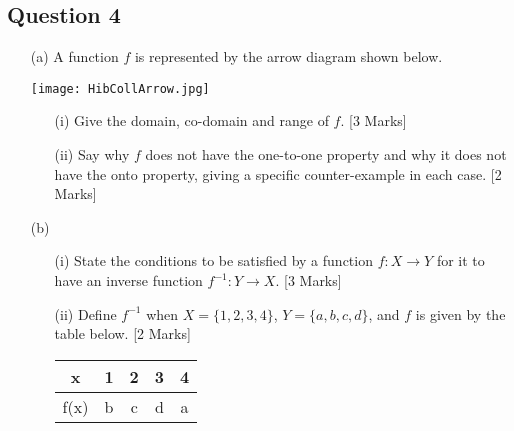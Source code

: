 \subsection*{Question 4}

\begin{itemize}
\item[(a)] A function $f$ is represented by the arrow diagram shown below.
\begin{center}
\texttt{[image: HibCollArrow.jpg]}
\end{center}

\begin{itemize}
\item[(i)] Give the domain, co-domain and range of $f$. [3 Marks]
\item[(ii)] Say why $f$ does not have the one-to-one property and why it does not
have the onto property, giving a specific counter-example in each case. [2 Marks]
\end{itemize}
\item[(b)]
\begin{itemize}
\item[(i)] State the conditions to be satisfied by a function $f : X \rightarrow Y$ for it to have
an inverse function $f^{-1} : Y \rightarrow X$. [3 Marks]
\item[(ii)] Define $f^{-1}$ when $X = \{1,2,3,4\}$, $Y = \{a,b,c,d\}$, and $f$ is given by the
table below. [2 Marks] \\
\begin{center}
\begin{tabular}{|c|cccc|}
  \hline
  x & 1 & 2 & 3 & 4 \\ \hline
  f(x) & b & c & d & a \\
  \hline
\end{tabular}
\end{center}
\end{itemize}
\end{itemize}

